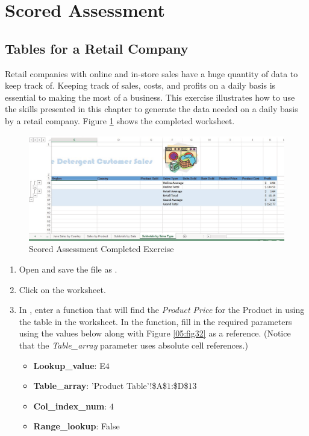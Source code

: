 \section{Scored Assessment}

\subsection{Tables for a Retail Company}

Retail companies with online and in-store sales have a huge quantity of data to keep track of. Keeping track of sales, costs, and profits on a daily basis is essential to making the most of a business. This exercise illustrates how to use the skills presented in this chapter to generate the data needed on a daily basis by a retail company. Figure \ref{05:fig31} shows the completed worksheet.

\begin{figure}[H]
	\centering
	\includegraphics[width=\maxwidth{.95\linewidth}]{gfx/ch05_fig31}
	\caption{Scored Assessment Completed Exercise}
	\label{05:fig31}
\end{figure}

\begin{enumerate}
	\item Open  and save the file as .
	\item Click on the  worksheet.
	\item In , enter a  function that will find the \textit{Product Price} for the Product in  using the table in the  worksheet. In the  function, fill in the required parameters using the values below along with Figure \ref{05:fig32} as a reference. (Notice that the \textit{Table\_array} parameter uses absolute cell references.)
	
	\begin{itemize}
		\item \textbf{Lookup\_value}: E$ 4 $
		\item \textbf{Table\_array}: 'Product Table'!\$A\$$ 1 $:\$D\$$ 13 $
		\item \textbf{Col\_index\_num}: $ 4 $
		\item \textbf{Range\_lookup}: False
	\end{itemize}
	
\end{enumerate}

